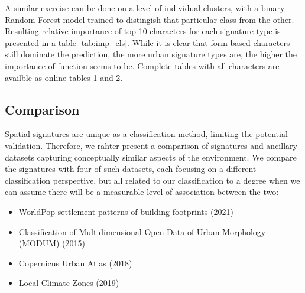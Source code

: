 \documentclass[fleqn,10pt]{wlscirep}
\begin{document}
A similar exercise can be done on a level of individual clusters, with a binary Random Forest model trained
to distingish that particular class from the other. Resulting relative importance of top 10 characters for each signature type
is presented in a table \ref{tab:imp_cls}. While it is clear that form-based characters still dominate the prediction,
the more urban signature types are, the higher the importance of function seems to be. Complete tables
with all characters are availble as online tables 1 and 2.

\subsection*{Comparison}

Spatial signatures are unique as a classification method, limiting the potential
validation. Therefore, we rahter present a comparison of signatures and ancillary datasets capturing
conceptually similar aspects of the environment. We compare the signatures with four of
such datasets, each focusing on a different classification perspective, but all related
to our classification to a degree when we can assume there will be a measurable level of
association between the two:

\begin{itemize}
    \item WorldPop settlement patterns of building footprints (2021)\cite{jochem2021tools}
    \item Classification of Multidimensional Open Data of Urban Morphology (MODUM) (2015)\cite{alexiou2016}
    \item Copernicus Urban Atlas (2018)\cite{eea2018}
    \item Local Climate Zones (2019)\cite{demuzere2019mapping}
\end{itemize}
\end{document}
